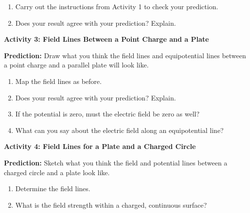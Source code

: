 \begin{enumerate}
\item Carry out the instructions from Activity 1 to check your prediction.
\item Does your result agree with your prediction? Explain.\vspace{15mm}

\end{enumerate}
\textbf{Activity 3: Field Lines Between a Point Charge and a Plate}

\textbf{Prediction:} Draw what you think the field lines and equipotential
lines between a point charge and a parallel plate will look like.
\vspace{1in}

\begin{enumerate}
\item Map the field lines as before.
\item Does your result agree with your prediction? Explain.\vspace{15mm}

\item If the potential is zero, must the electric field be zero as well?\vspace{15mm}

\item What can you say about the electric field along an equipotential line?\vspace{15mm}

\end{enumerate}
\textbf{Activity 4: Field Lines for a Plate and a Charged Circle}

\textbf{Prediction:} Sketch what you think the field and potential
lines between a charged circle and a plate look like.
\vspace{1in}

\begin{enumerate}
\item Determine the field lines.
\item What is the field strength within a charged, continuous surface?\vspace{15mm}
\end{enumerate}


